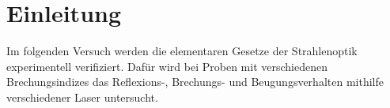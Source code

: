 \section{Einleitung}
\label{sec:einleitung}
Im folgenden Versuch werden die elementaren Gesetze der Strahlenoptik
experimentell verifiziert. Dafür wird bei Proben mit verschiedenen Brechungsindizes
das Reflexions-, Brechungs- und Beugungsverhalten mithilfe verschiedener
Laser untersucht.
